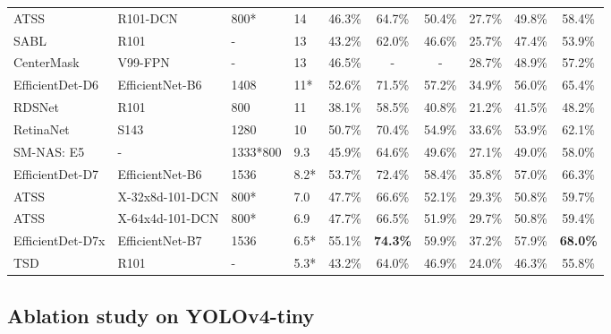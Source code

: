 \documentclass[10pt,twocolumn,letterpaper]{article}
\begin{document}
\begin{table*}[h]
\begin{threeparttable}[h]
\begin{tabular}{llllcccccc}
		ATSS \cite{zhang2019bridging} & R101-DCN \cite{dai2017deformable} & 800* & 14 & 46.3\% & 64.7\% & 50.4\% & 27.7\% & 49.8\% & 58.4\% \\
		SABL \cite{wang2020side} & R101 \cite{he2016deep} & - & 13 & 43.2\% & 62.0\% & 46.6\% & 25.7\% & 47.4\% & 53.9\% \\
		CenterMask \cite{lee2019centermask} & V99-FPN \cite{lee2019centermask} & - & 13 & 46.5\% & - & - & 28.7\% & 48.9\% & 57.2\% \\
		EfficientDet-D6 \cite{tan2019efficientdet} & EfficientNet-B6 \cite{tan2019efficientnet} & 1408 & 11* & 52.6\% & 71.5\% & 57.2\% & 34.9\% & 56.0\% & 65.4\% \\
		RDSNet \cite{wang2019rdsnet} & R101 \cite{he2016deep} & 800 & 11 & 38.1\% & 58.5\% & 40.8\% & 21.2\% & 41.5\% & 48.2\% \\
		RetinaNet \cite{lin2017focal} & S143 \cite{du2019spinenet} & 1280 & 10 & 50.7\% & 70.4\% & 54.9\% & 33.6\% & 53.9\% & 62.1\% \\
		SM-NAS: E5 \cite{yao2019sm} & - & 1333*800 & 9.3 & 45.9\% & 64.6\% & 49.6\% & 27.1\% & 49.0\% & 58.0\% \\
		EfficientDet-D7 \cite{tan2019efficientdet} & EfficientNet-B6 \cite{tan2019efficientnet} & 1536 & 8.2* & 53.7\% & 72.4\% & 58.4\% & 35.8\% & 57.0\% & 66.3\% \\
		ATSS \cite{zhang2019bridging} & X-32x8d-101-DCN \cite{dai2017deformable} & 800* & 7.0 & 47.7\% & 66.6\% & 52.1\% & 29.3\% & 50.8\% & 59.7\% \\
		ATSS \cite{zhang2019bridging} & X-64x4d-101-DCN \cite{dai2017deformable} & 800* & 6.9 & 47.7\% & 66.5\% & 51.9\% & 29.7\% & 50.8\% & 59.4\% \\
		EfficientDet-D7x \cite{tan2019efficientdet} & EfficientNet-B7 \cite{tan2019efficientnet} & 1536 & 6.5* & 55.1\% & \textbf{74.3\%} & 59.9\% & 37.2\% & 57.9\% & \textbf{68.0\%} \\
		TSD \cite{song2020revisiting} & R101 \cite{he2016deep} & - & 5.3* & 43.2\% & 64.0\% & 46.9\% & 24.0\% & 46.3\% & 55.8\% \\
		\bottomrule
	\end{tabular}
\end{threeparttable}
\end{table*}


\subsection{Ablation study on YOLOv4-tiny}
\end{document}
